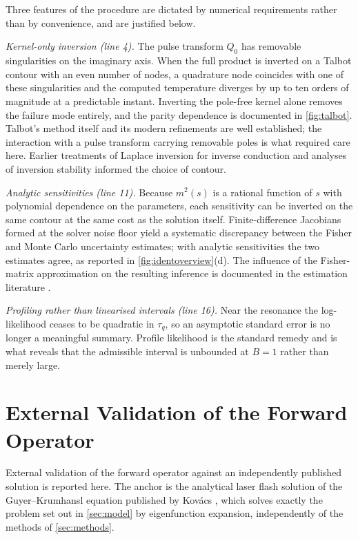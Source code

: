\documentclass[preprint,12pt,a4paper]{elsarticle}
\theoremstyle{plain}
\theoremstyle{definition}
\theoremstyle{remark}
\newcommand{\tq}{\tau_{q}}
\newcommand{\Bnum}{B}
\begin{document}
Three features of the procedure are dictated by numerical requirements rather
than by convenience, and are justified below.

\emph{Kernel-only inversion (line 4).} The pulse transform $\hat{Q}_0$ has
removable singularities on the imaginary axis. When the full product is inverted
on a Talbot contour with an even number of nodes, a quadrature node coincides
with one of these singularities and the computed temperature diverges by up to
ten orders of magnitude at a predictable instant. Inverting the pole-free kernel
alone removes the failure mode entirely, and the parity dependence is documented
in \cref{fig:talbot}. Talbot's method itself \cite{Talbot1979} and its modern
refinements \cite{Dingfelder2014} are well established; the interaction with a
pulse transform carrying removable poles is what required care here. Earlier
treatments of Laplace inversion for inverse conduction \cite{Woo1981} and
analyses of inversion stability \cite{Kryzhniy2006,Zakian1969}
informed the choice of contour.

\emph{Analytic sensitivities (line 11).} Because $m^{2}(s)$ is a rational
function of $s$ with polynomial dependence on the parameters, each sensitivity
can be inverted on the same contour at the same cost as the solution itself.
Finite-difference Jacobians formed at the solver noise floor yield a systematic
discrepancy between the Fisher and Monte Carlo uncertainty estimates; with
analytic sensitivities the two estimates agree, as reported in
\cref{fig:identoverview}(d). The influence of the Fisher-matrix approximation
on the resulting inference is documented in the estimation literature
\cite{Stromberg2016}.

\emph{Profiling rather than linearised intervals (line 16).} Near the resonance
the log-likelihood ceases to be quadratic in $\tq$, so an asymptotic standard
error is no longer a meaningful summary. Profile likelihood is the standard
remedy \cite{Raue2009,Simpson2023} and is what reveals that the admissible
interval is unbounded at $\Bnum=1$ rather than merely large.

\section{External Validation of the Forward Operator}
\label{sec:validation}

External validation of the forward operator against an independently
published solution is reported here. The anchor is the analytical laser flash
solution of the Guyer--Krumhansl equation published by Kov\'acs
\cite{Kovacs2018}, which solves exactly the problem set out in
\cref{sec:model} by eigenfunction expansion, independently of the methods of
\cref{sec:methods}.
\end{document}
